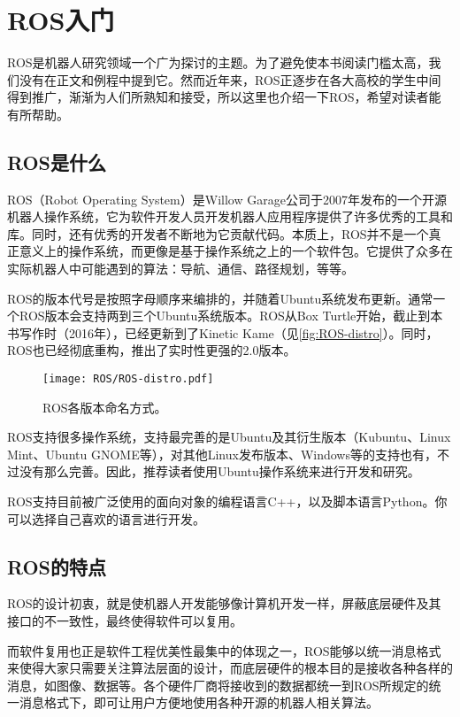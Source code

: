 \chapter{ROS入门}
ROS是机器人研究领域一个广为探讨的主题。为了避免使本书阅读门槛太高，我们没有在正文和例程中提到它。然而近年来，ROS正逐步在各大高校的学生中间得到推广，渐渐为人们所熟知和接受，所以这里也介绍一下ROS，希望对读者能有所帮助。

\section{ROS是什么}
ROS（Robot Operating System）是Willow Garage公司于2007年发布的一个开源机器人操作系统，它为软件开发人员开发机器人应用程序提供了许多优秀的工具和库。同时，还有优秀的开发者不断地为它贡献代码。本质上，ROS并不是一个真正意义上的操作系统，而更像是基于操作系统之上的一个软件包。它提供了众多在实际机器人中可能遇到的算法：导航、通信、路径规划，等等。

ROS的版本代号是按照字母顺序来编排的，并随着Ubuntu系统发布更新。通常一个ROS版本会支持两到三个Ubuntu系统版本。ROS从Box Turtle开始，截止到本书写作时（2016年），已经更新到了Kinetic Kame（见\autoref{fig:ROS-distro}）。同时，ROS也已经彻底重构，推出了实时性更强的2.0版本。

\begin{figure}[!ht]
	\centering
	\texttt{[image: ROS/ROS-distro.pdf]}
	\caption{ROS各版本命名方式。}
	\label{fig:ROS-distro}
\end{figure}

ROS支持很多操作系统，支持最完善的是Ubuntu及其衍生版本（Kubuntu、Linux Mint、Ubuntu GNOME等），对其他Linux发布版本、Windows等的支持也有，不过没有那么完善。因此，推荐读者使用Ubuntu操作系统来进行开发和研究。

ROS支持目前被广泛使用的面向对象的编程语言C++，以及脚本语言Python。你可以选择自己喜欢的语言进行开发。

\section{ROS的特点}
ROS的设计初衷，就是使机器人开发能够像计算机开发一样，屏蔽底层硬件及其接口的不一致性，最终使得软件可以复用。

而软件复用也正是软件工程优美性最集中的体现之一，ROS能够以统一消息格式来使得大家只需要关注算法层面的设计，而底层硬件的根本目的是接收各种各样的消息，如图像、数据等。各个硬件厂商将接收到的数据都统一到ROS所规定的统一消息格式下，即可让用户方便地使用各种开源的机器人相关算法。

